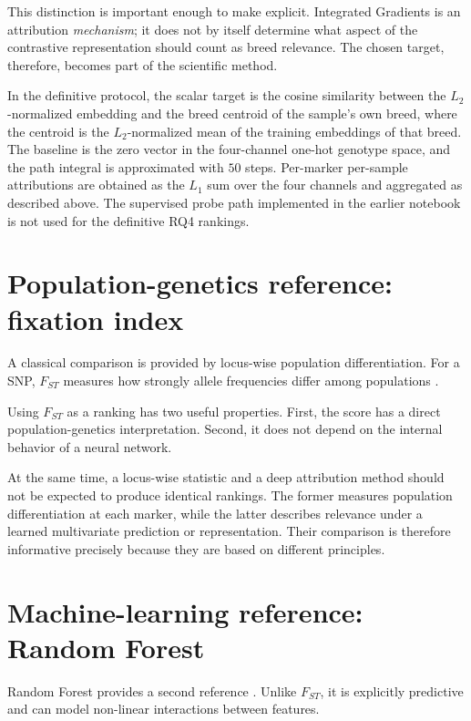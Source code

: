This distinction is important enough to make explicit. Integrated
Gradients is an attribution \emph{mechanism}; it does not by itself
determine what aspect of the contrastive representation should count
as breed relevance. The chosen target, therefore, becomes part of the
scientific method.

In the definitive protocol, the scalar target is the cosine similarity
between the $L_2$-normalized embedding and the breed centroid of the
sample's own breed, where the centroid is the $L_2$-normalized mean of
the training embeddings of that breed. The baseline is the zero vector
in the four-channel one-hot genotype space, and the path integral is
approximated with $50$ steps. Per-marker per-sample attributions are
obtained as the $L_1$ sum over the four channels and aggregated as
described above. The supervised probe path implemented in the earlier
notebook is not used for the definitive RQ4 rankings.

\section{Population-genetics reference: fixation index}
\label{sec:fst_ranking}

A classical comparison is provided by locus-wise population
differentiation. For a SNP, $F_{ST}$ measures how strongly allele
frequencies differ among populations
\cite{wright1949genetical, weir1984estimating}.

Using $F_{ST}$ as a ranking has two useful properties. First, the score
has a direct population-genetics interpretation. Second, it does not
depend on the internal behavior of a neural network.

At the same time, a locus-wise statistic and a deep attribution method
should not be expected to produce identical rankings. The former
measures population differentiation at each marker, while the latter
describes relevance under a learned multivariate prediction or
representation. Their comparison is therefore informative precisely
because they are based on different principles.

\section{Machine-learning reference: Random Forest}
\label{sec:rf_ranking}

Random Forest provides a second reference \cite{breiman2001random}.
Unlike $F_{ST}$, it is explicitly predictive and can model non-linear
interactions between features.


